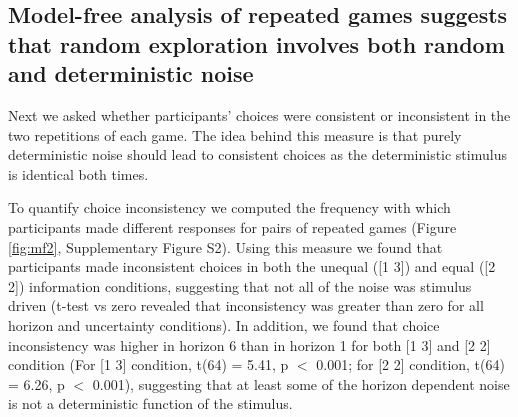 \documentclass[12pt]{article}
\begin{document}
	\subsection*{Model-free analysis of repeated games suggests that random exploration involves both random and deterministic noise}
	
	Next we asked whether participants' choices were consistent or inconsistent in the two repetitions of each game. The idea behind this measure is that purely deterministic noise should lead to consistent choices as the deterministic stimulus is identical both times. 
	
	To quantify choice inconsistency we computed the frequency with which participants made different responses for pairs of repeated games (Figure \ref{fig:mf2}, Supplementary Figure S2). Using this measure we found that participants made inconsistent choices in both the unequal ([1 3]) and equal ([2 2]) information conditions, suggesting that not all of the noise was stimulus driven (t-test vs zero revealed that inconsistency was greater than zero for all horizon and uncertainty conditions). In addition, we found that choice inconsistency was higher in horizon 6 than in horizon 1 for both [1 3] and [2 2] condition (For [1 3] condition, t(64) = 5.41, p $<$ 0.001; for [2 2] condition, t(64) = 6.26, p $<$ 0.001), suggesting that at least some of the horizon dependent noise is not a deterministic function of the stimulus.
	
\end{document}
